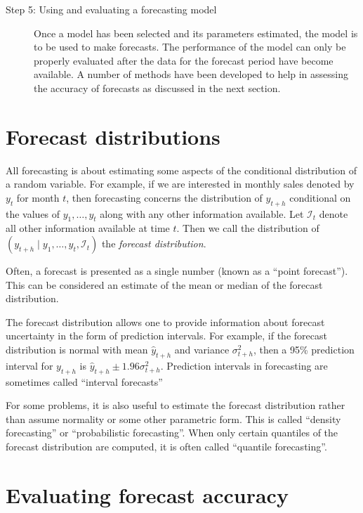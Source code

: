 \documentclass[a4paper,10pt]{article}
\begin{document}
\begin{description}
  \item[Step 5: Using and evaluating a forecasting model]
    Once a model has been selected and its parameters estimated, the model is to be used to make forecasts. The performance of the model can only be properly evaluated after the data for the forecast period have become available. A number of methods have been developed to help in assessing the accuracy of forecasts as discussed in the next section.

\end{description}

\section{Forecast distributions}

All forecasting is about estimating some aspects of the conditional distribution of a random variable. For example, if we are interested in monthly sales denoted by $y_t$ for month $t$, then forecasting concerns the distribution of $y_{t+h}$ conditional on the values of $y_1,\dots,y_t$ along with any other information available. Let $\mathcal{I}_t$ denote all other information available at time $t$. Then we call the distribution of $(y_{t+h} \mid y_1,\dots,y_t,\mathcal{I}_t)$ the \textit{forecast distribution}.

Often, a forecast is presented as a single number (known as a ``point forecast''). This can be considered an estimate of the mean or median of the forecast distribution.

The forecast distribution allows one to provide information about forecast uncertainty in the form of prediction intervals. For example, if the forecast distribution is normal with mean $\hat{y}_{t+h}$ and variance $\sigma^2_{t+h}$, then a 95\% prediction interval for $y_{t+h}$ is $\hat{y}_{t+h}\pm 1.96\sigma_{t+h}^2$. Prediction intervals in forecasting are sometimes called ``interval forecasts''

For some problems, it is also useful to estimate the forecast distribution rather than assume normality or some other parametric form. This is called ``density forecasting'' or ``probabilistic forecasting''. When only certain quantiles of the forecast distribution are computed, it is often called ``quantile forecasting''.

\section{Evaluating forecast accuracy}
\end{document}
